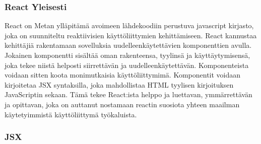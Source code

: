 

\subsubsection{React Yleisesti}






%




React on Metan ylläpitämä avoimeen lähdekoodiin perustuva javascript kirjasto,
joka on suunniteltu reaktiivisien käyttöliittymien kehittämiseen.\citemissing
React kannustaa kehittäjiä rakentamaan sovelluksia uudelleenkäytettävien komponenttien avulla.
Jokainen komponentti sisältää oman rakenteensa, tyylinsä ja käyttäytymisensä, joka tekee niistä helposti siirrettävän ja uudelleenkäytettävän.
Komponenteista voidaan sitten koota monimutkaisia käyttöliittymimä. 
%
Komponentit voidaan kirjoitetaa JSX syntaksilla, joka mahdollistaa HTML tyylisen kirjoituksen JavaScriptin sekaan.
Tämä tekee React:ista helppo ja luettavan, ymmärrettävän ja opittavan, joka on auttanut nostamaan reactin suosiota yhteen maailman käytetyimmistä käyttöliittymä työkaluista.
\medskip









\subsubsection{JSX}




